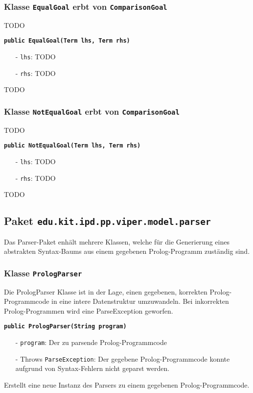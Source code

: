 \documentclass[parskip=full,11pt,twoside]{scrartcl}
\begin{document}
\subsubsection{Klasse \texttt{EqualGoal} erbt von \texttt{ComparisonGoal}}
TODO

\textbf{\texttt{public EqualGoal(Term lhs, Term rhs)}}
\begin{itemize}[noitemsep]
	\item[-] \texttt{lhs}: TODO
	\item[-] \texttt{rhs}: TODO
\end{itemize}
TODO

\subsubsection{Klasse \texttt{NotEqualGoal} erbt von \texttt{ComparisonGoal}}
TODO

\textbf{\texttt{public NotEqualGoal(Term lhs, Term rhs)}}
\begin{itemize}[noitemsep]
	\item[-] \texttt{lhs}: TODO
	\item[-] \texttt{rhs}: TODO
\end{itemize}
TODO

\newpage
\subsection{Paket \texttt{edu.kit.ipd.pp.viper.model.parser}}

Das Parser-Paket enhält mehrere Klassen, welche für die Generierung eines abstrakten Syntax-Baums aus einem gegebenen Prolog-Programm zuständig sind.

\subsubsection{Klasse \texttt{PrologParser}}

Die PrologParser Klasse ist in der Lage, einen gegebenen, korrekten Prolog-Programmcode in eine intere Datenstruktur umzuwandeln. Bei inkorrekten Prolog-Programmen wird eine ParseException geworfen.

\textbf{\texttt{public PrologParser(String program)}}
\begin{itemize}[noitemsep]
	\item[-] \texttt{program}: Der zu parsende Prolog-Programmcode
	\item[-] Throws \texttt{ParseException}: Der gegebene Prolog-Programmcode konnte aufgrund von Syntax-Fehlern nicht geparst werden.
\end{itemize}
Erstellt eine neue Instanz des Parsers zu einem gegebenen Prolog-Programmcode.
\end{document}
